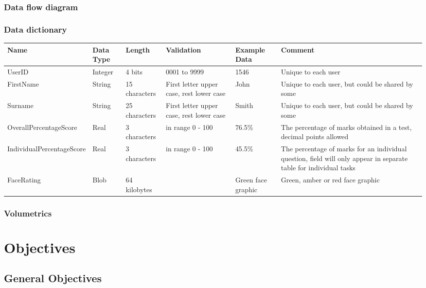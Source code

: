 \subsubsection{Data flow diagram}

\subsubsection{Data dictionary}

\begin{center}
\begin{tabular}{|p{3cm}|p{1.6cm}|p{2cm}|p{2cm}|p{2cm}|p{3.5cm}|}
\hline
\textbf{Name} & \textbf{Data Type} & \textbf{Length} & \textbf{Validation} & \textbf{Example Data} & \textbf{Comment} \\ \hline
UserID & Integer & 4 bits & 0001 to 9999 & 1546 & Unique to each user \\ \hline
FirstName & String & 15 characters & First letter upper case, rest lower case & John & Unique to each user, but could be shared by some \\ \hline
Surname & String & 25 characters & First letter upper case, rest lower case & Smith & Unique to each user, but could be shared by some \\ \hline
OverallPercentageScore & Real & 3 characters & in range 0 - 100 & 76.5\% & The percentage of marks obtained in a test, decimal points allowed \\ \hline
IndividualPercentageScore & Real & 3 characters & in range 0 - 100 & 45.5\% & The percentage of marks for an individual question, field will only appear in separate table for individual tasks \\ \hline
FaceRating & Blob & 64 kilobytes & \ &  Green face graphic & Green, amber or red face graphic \\ \hline

\end{tabular}
\end{center}

\subsubsection{Volumetrics}

\section{Objectives}

\subsection{General Objectives}

